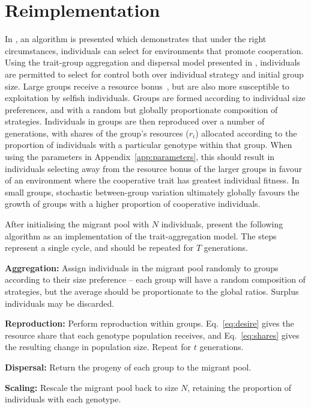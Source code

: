 \documentclass[11pt]{article}
\begin{document}
\section{Reimplementation}
In \citet{orig}, an algorithm is presented which demonstrates that under the right circumstances, individuals can select for environments that promote cooperation. Using the trait-group aggregation and dispersal model presented in \citet{wilson}, individuals are permitted to select for control both over individual strategy and initial group size. Large groups receive a resource bonus~\citep{allee}, but are also more susceptible to exploitation by selfish individuals. Groups are formed according to individual size preferences, and with a random but globally proportionate composition of strategies. Individuals in groups are then reproduced over a number of generations, with shares of the group's resources ($r_i$) allocated according to the proportion of individuals with a particular genotype within that group. When using the parameters in Appendix~\ref{app:parameters}, this should result in individuals selecting away from the resource bonus of the larger groups in favour of an environment where the cooperative trait has greatest individual fitness. In small groups, stochastic between-group variation ultimately globally favours the growth of groups with a higher proportion of cooperative individuals.

After initialising the migrant pool with $N$ individuals, \citet{orig} present the following algorithm as an implementation of the trait-aggregation model. The steps represent a single cycle, and should be repeated for $T$ generations.\\
\begin{compactenum}
\item\textbf{Aggregation:} Assign individuals in the migrant pool randomly to groups according to their size preference -- each group will have a random composition of strategies, but the average should be proportionate to the global ratios. Surplus individuals may be discarded.
\item\textbf{Reproduction:} Perform reproduction within groups. Eq.~\ref{eq:desire} gives the resource share that each genotype population receives, and Eq.~\ref{eq:shares} gives the resulting change in population size. Repeat for $t$ generations.
\item\textbf{Dispersal:} Return the progeny of each group
to the migrant pool.
\item\textbf{Scaling:} Rescale the migrant pool
back to size $N$, retaining the proportion of individuals with each genotype.
\end{compactenum}
\end{document}
